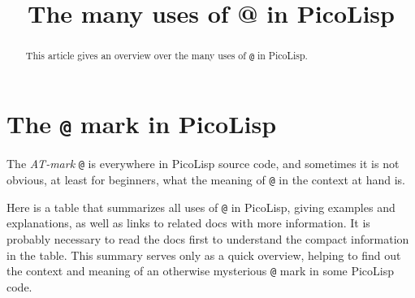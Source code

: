 \title{The many uses of @ in PicoLisp}

\maketitle





% 


\begin{abstract}
  This article gives an overview over the many uses of \texttt{@} in
  PicoLisp.
\end{abstract}

\section{The \texttt{@} mark in PicoLisp}
\label{sec:at-mark-the-at-mark-in-picolisp}

The \emph{AT-mark} \texttt{@} is everywhere in PicoLisp source code, and
sometimes it is not obvious, at least for beginners, what the meaning
of \texttt{@} in the context at hand is.

Here is a table that summarizes all uses of \texttt{@} in PicoLisp,
giving examples and explanations, as well as links to related docs
with more information. It is probably necessary to read the docs first
to understand the compact information in the table. This summary
serves only as a quick overview, helping to find out the context and
meaning of an otherwise mysterious \texttt{@} mark in some PicoLisp
code.


